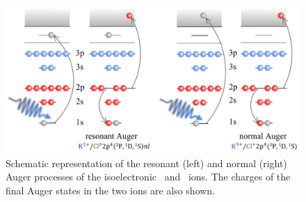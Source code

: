 \begin{figure}
\includegraphics[scale=0.8]{figures/auger_process.pdf}
\caption{Schematic representation of the resonant (left) and normal (right) Auger processes of the isoelectronic \ki~and \cli~ions. The charges of the final Auger states in the two ions are also shown.}
\label{fg:auger}
\end{figure}